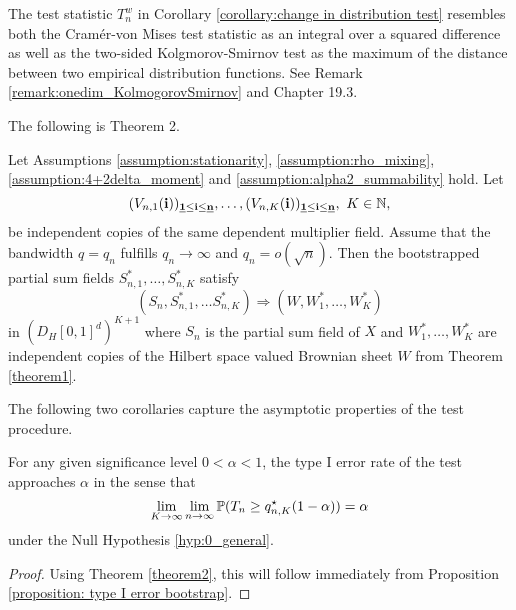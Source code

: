 \begin{remark}
    The test statistic $T^w_n$ in Corollary \ref{corollary:change in distribution test} resembles both the Cramér-von Mises test statistic as an integral over a squared difference as well as the two-sided Kolgmorov-Smirnov test as the maximum of the distance between two empirical distribution functions.
    See Remark \ref{remark:onedim_KolmogorovSmirnov} and \cite{vaart_1998} Chapter 19.3.
\end{remark}

The following is \cite{[0]BUCCHIA2017344} Theorem 2.
\begin{thm} \label{theorem2}
    Let Assumptions \ref{assumption:stationarity}, \ref{assumption:rho_mixing}, \ref{assumption:4+2delta_moment} and \ref{assumption:alpha2_summability} hold. Let
    \[ (V_{n, 1}(\mathbf{i}))_{\usbf[1] \leq \mathbf{i} \leq \usbf[n]}, \ldots, (V_{n, K}(\mathbf{i}))_{\usbf[1] \leq \mathbf{i} \leq \usbf[n]}, \ K \in \NN, \]
    be independent copies of the same dependent multiplier field. Assume that the bandwidth $q = q_n$ fulfills $q_n \to \infty$ and $q_n = o(\sqrt{n})$. Then the bootstrapped partial sum fields $S_{n, 1}^{*}, \ldots, S_{n, K}^{*}$ satisfy
    \begin{equation*} 
        (S_n, S_{n, 1}^{*}, \ldots S_{n, K}^{*}) \Rightarrow (W, W_1^{*}, \ldots, W_K^{*})
    \end{equation*}
    in $\left(D_H[0, 1]^d\right)^{K+1}$ where $S_n$ is the partial sum field of $X$ and $W_1^{*}, \ldots, W_K^{*}$ are independent copies of the Hilbert space valued Brownian sheet $W$ from Theorem \ref{theorem1}.
\end{thm}

The following two corollaries capture the asymptotic properties of the test procedure.
\begin{corollary} \label{corollary type I error rate}
    For any given significance level $0 < \alpha < 1$, the type I error rate of the test approaches $\alpha$ in the sense that
    \[ \lim\limits_{K \to \infty} \lim\limits_{n \to \infty} \mathbb{P}(T_n \geq q_{n, K}^{\star}(1-\alpha)) = \alpha \]
    under the Null Hypothesis \ref{hyp:0_general}.
\end{corollary}
\begin{proof}
    Using Theorem \ref{theorem2}, this will follow immediately from Proposition \ref{proposition: type I error bootstrap}.
\end{proof}

